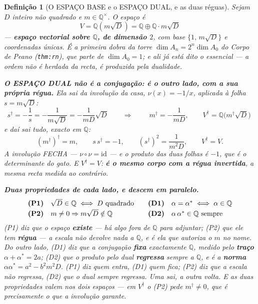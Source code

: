 \documentclass[11pt,a4paper]{article}
\newtheorem{definicao}{Definição}
\newcommand{\code}[1]{\texttt{\small #1}}
\newcommand{\dg}{^{\dagger}}
\begin{document}
\begin{definicao}[O ESPAÇO BASE e o ESPAÇO DUAL, e as duas réguas]\label{def:espaco}
Sejam $D$ inteiro \emph{não quadrado} e $m\in\mathbb{Q}^{\times}$. O espaço é
\[
\boxed{\;V=\mathbb{Q}(m\sqrt D)=\mathbb{Q}\oplus\mathbb{Q}\cdot m\sqrt D\;}
\]
--- \textbf{espaço vectorial sobre $\mathbb{Q}$, de dimensão $2$}, com base
$\{1,\,m\sqrt D\}$ e coordenadas únicas. É a \emph{primeira dobra} da torre
$\dim A_n=2^{n}\dim A_0$ do \emph{Corpo de Peano} (\code{thm:rn}), que parte de
$\dim A_0=1$; e ali já está dito o essencial --- \emph{a ordem não é herdada da recta, é
produzida pela dualidade}.

\textbf{O ESPAÇO DUAL não é a conjugação: é o outro lado, com a sua própria régua.} Ela sai
da involução da casa, $\nu(x)=-1/x$, aplicada à folha $s=m\sqrt D$:
\[
s\dg=-\frac1s=-\frac1{m\sqrt D}=-\frac{1}{mD}\sqrt D
\qquad\Longrightarrow\qquad
\boxed{\;m\dg=-\frac{1}{mD},\qquad V\dg=\mathbb{Q}\bigl(m\dg\sqrt D\bigr)\;}
\]
e daí sai tudo, exacto em $\mathbb{Q}$:
\[
(m\dg)\dg=m,\qquad
s\,s\dg=-1,\qquad
(s\dg)^{2}=\frac{1}{m^{2}D},\qquad
V\dg=V .
\]
\emph{A involução FECHA} --- $\nu\circ\nu=\mathrm{id}$ --- e o produto das duas folhas é
$-1$, que é o determinante do gato. E $V\dg=V$: \textbf{é o mesmo corpo com a régua
invertida}, a mesma recta medida ao contrário.

\textbf{Duas propriedades de cada lado, e descem em paralelo.}
\[
\begin{array}{ll@{\qquad}ll}
\textbf{(P1)} & \sqrt D\in\mathbb{Q}\iff D\ \text{quadrado} &
\textbf{(D1)} & \alpha=\alpha^{\ast}\iff\alpha\in\mathbb{Q}\\[2pt]
\textbf{(P2)} & m\neq0\Rightarrow m\sqrt D\notin\mathbb{Q} &
\textbf{(D2)} & \alpha\,\alpha^{\ast}\in\mathbb{Q}\ \text{sempre}
\end{array}
\]
(P1) diz que o espaço \textbf{existe} --- há algo fora de $\mathbb{Q}$ para adjuntar; (P2)
que ele tem \textbf{régua} --- a escala não devolve nada a $\mathbb{Q}$, e é ela que
autoriza o $m$ no nome. Do outro lado, (D1) diz que a conjugação \textbf{fixa} exactamente
$\mathbb{Q}$, medido pelo \textbf{traço} $\alpha+\alpha^{\ast}=2a$; (D2) que o produto pelo
dual \textbf{regressa} sempre a $\mathbb{Q}$, e é a \textbf{norma}
$\alpha\alpha^{\ast}=a^{2}-b^{2}m^{2}D$. \emph{(P1) diz quem entra, (D1) quem fica; (P2)
diz que a escala não regressa, (D2) que o dual sempre regressa.} Uma sai, a outra volta.
E as duas propriedades valem nos \emph{dois} espaços --- em $V\dg$ o (P2) pede
$m\dg\neq0$, que é precisamente o que a involução garante.


\end{definicao}
\end{document}
